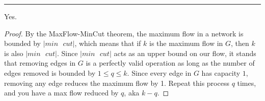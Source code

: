 \documentclass[11pt]{article}
\begin{document}
\noindent\rule{17cm}{0.4pt}

Yes.

\begin{proof}
By the MaxFlow-MinCut theorem, the maximum flow in a network is bounded by $|min\text{ }cut|$, which means that if $k$ is the maximum flow in $G$, then $k$ is also $|min\text{ }cut|$. Since $|min\text{ }cut|$ acts as an upper bound on our flow, it stands that removing edges in $G$ is a perfectly valid operation as long as the number of edges removed is bounded by $1 \leq q \leq k$. Since every edge in $G$ has capacity $1$, removing any edge  reduces the maximum flow by 1. Repeat this process $q$ times, and you have a max flow reduced by $q$, aka $k-q$.
\end{proof} 
\end{document}
